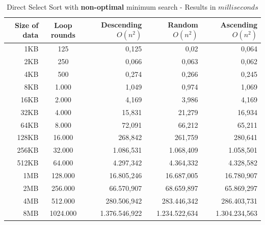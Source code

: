 \documentclass[11pt]{amsart}
\begin{document}
\clearpage
\begin{table}[htdp]
	\caption{Direct Select Sort with \textbf{non-optimal} minimum search - Results in $milliseconds$}
	\begin{tabular}{|r|c|r|r|r|} \hline
		Size of data & Loop rounds & \parbox[c]{3.5cm}{Descending \\ $O(n^2)$} & \parbox[c]{3.5cm}{Random \\$O(n^2)$} & \parbox[c]{3.5cm}{Ascending \\ $O(n^2)$} \\ \hline
		1KB & 125 & 0,125 & 0,02 & 0,064 \\ \hline
		2KB & 250 & 0,066 & 0,063 & 0,062 \\ \hline
		4KB & 500 & 0,274 & 0,266 & 0,245 \\ \hline
		8KB & 1.000 & 1,049 & 0,974 & 1,069 \\ \hline
		16KB & 2.000 & 4,169 & 3,986 & 4,169 \\ \hline
		32KB & 4.000 & 15,831 & 21,279 & 16,934 \\ \hline
		64KB & 8.000 & 72,091 & 66,212 & 65,211 \\ \hline
		128KB & 16.000 & 268,842 & 261,759 & 280,641 \\ \hline
		256KB & 32.000 & 1.086,531 & 1.068,409 & 1.058,501 \\ \hline
		512KB & 64.000 & 4.297,342 & 4.364,332 & 4.328,582 \\ \hline
		1MB & 128.000 & 16.805,246 & 16.687,005 & 16.780,907 \\ \hline
		2MB & 256.000 & 66.570,907 & 68.659,897 & 65.869,297 \\ \hline
		4MB & 512.000 & 280.506,942 & 283.446,342 & 286.403,731 \\ \hline
		8MB & 1024.000 & 1.376.546,922 & 1.234.522,634 & 1.304.234,563 \\ \hline
	\end{tabular}
	\label{default}
\end{table}%
\clearpage
\end{document}
